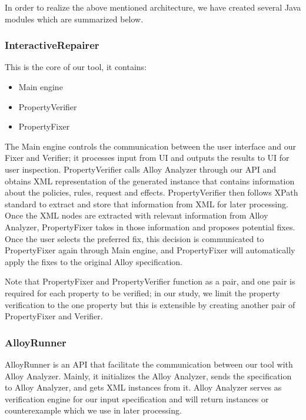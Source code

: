 \documentclass[letterpaper]{acm_proc_article-sp}
\begin{document}
In order to realize the above mentioned architecture, we have created several Java modules which are summarized below.

\subsubsection{InteractiveRepairer}
This is the core of our tool, it contains:
\begin{itemize}
\item Main engine
\item PropertyVerifier
\item PropertyFixer
\end{itemize}
The Main engine controls the communication between the user interface and our Fixer and Verifier; it processes input from UI and outputs the results to UI for user inspection. PropertyVerifier calls Alloy Analyzer through our API and obtains XML representation of the generated instance that contains information about the policies, rules, request and effects. PropertyVerifier then follows XPath standard to extract and store that information from XML for later processing. Once the XML nodes are extracted with relevant information from Alloy Analyzer, PropertyFixer takes in those information and proposes potential fixes. Once the user selects the preferred fix, this decision is communicated to PropertyFixer again through Main engine, and PropertyFixer will automatically apply the fixes to the original Alloy specification.

Note that PropertyFixer and PropertyVerifier function as a pair, and one pair is required for each property to be verified; in our study, we limit the property verification to the one property but this is extensible by creating another pair of PropertyFixer and Verifier.

\subsubsection{AlloyRunner}
AlloyRunner is an API that facilitate the communication between our tool with Alloy Analyzer. Mainly, it initializes the Alloy Analyzer, sends the specification to Alloy Analyzer, and gets XML instances from it. Alloy Analyzer serves as verification engine for our input specification and will return instances or counterexample which we use in later processing.
\end{document}
